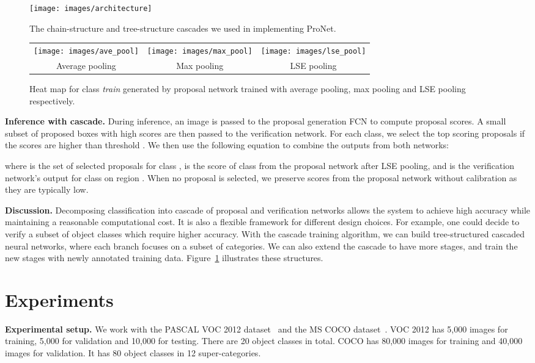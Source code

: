 \documentclass[10pt,twocolumn,letterpaper]{article}
\begin{document}
\begin{figure}
  \centering
    \texttt{[image: images/architecture]}
  \caption{The chain-structure and tree-structure cascades we used in implementing ProNet.}
  \label{fig:chain_tree}
\end{figure}



\begin{figure*}
\centering
\begin{tabular}{ccc}
\texttt{[image: images/ave\_pool]}&\texttt{[image: images/max\_pool]}&\texttt{[image: images/lse\_pool]}\\
Average pooling & Max pooling & LSE pooling
\end{tabular}  
\caption{Heat map for class \textit{train} generated by proposal network trained with average pooling, max pooling and LSE pooling respectively.}
\label{fig:pool_compare}
\end{figure*}

\textbf{Inference with cascade.} During inference, an image is passed to the proposal generation FCN to compute proposal scores. A small subset of proposed boxes with high scores are then passed to the verification network. For each class, we select the top  scoring proposals if the scores are higher than threshold . We then use the following equation to combine the outputs from both networks:

where  is the set of selected proposals for class ,  is the score of class  from the proposal network after LSE pooling, and  is the verification network's output for class  on region . When no proposal is selected, we preserve scores from the proposal network without calibration as they are typically low.

\textbf{Discussion.} Decomposing classification into cascade of proposal and verification networks allows the system to achieve high accuracy while maintaining a reasonable computational cost. It is also a flexible framework for different design choices. For example, one could decide to verify a subset of object classes which require higher accuracy. With the cascade training algorithm, we can build tree-structured cascaded neural networks, where each branch focuses on a subset of categories. We can also extend the cascade to have more stages, and train the new stages with newly annotated training data. Figure~\ref{fig:chain_tree} illustrates these structures.

\section{Experiments}
\textbf{Experimental setup.} We work with the PASCAL VOC 2012 dataset~\cite{Everingham10} and the MS COCO dataset~\cite{DBLP:journals/corr/LinMBHPRDZ14}. VOC 2012 has 5,000 images for training, 5,000 for validation and 10,000 for testing. There are 20 object classes in total. COCO has 80,000 images for training and 40,000 images for validation. It has 80 object classes in 12 super-categories.
\end{document}
